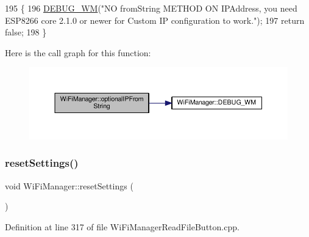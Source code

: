 \begin{DoxyCode}
195                                            \{
196       \hyperlink{class_wi_fi_manager_ae5f595c670ccbcf9a191baf50f5c7c26}{DEBUG\_WM}(\textcolor{stringliteral}{"NO fromString METHOD ON IPAddress, you need ESP8266 core 2.1.0 or newer for Custom
       IP configuration to work."});
197       \textcolor{keywordflow}{return} \textcolor{keyword}{false};
198     \}
\end{DoxyCode}
Here is the call graph for this function\+:
\nopagebreak
\begin{figure}[H]
\begin{center}
\leavevmode
\includegraphics[width=350pt]{d4/dc8/class_wi_fi_manager_aa248b818eee0423b14a88c637f7c4637_cgraph}
\end{center}
\end{figure}
\mbox{\label{class_wi_fi_manager_a0027749816b6c66bc845d7c5db760a33}} 
\subsubsection{\texorpdfstring{reset\+Settings()}{resetSettings()}}
{\footnotesize\ttfamily void Wi\+Fi\+Manager\+::reset\+Settings (\begin{DoxyParamCaption}{ }\end{DoxyParamCaption})}



Definition at line 317 of file Wi\+Fi\+Manager\+Read\+File\+Button.\+cpp.


